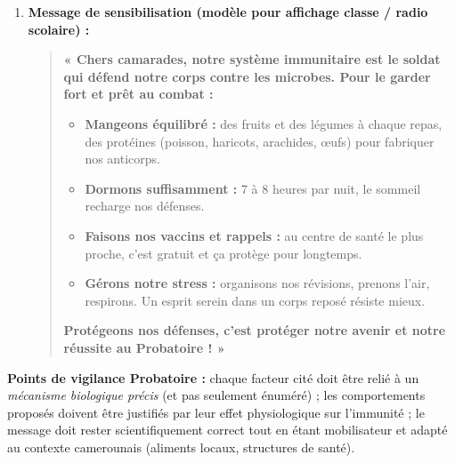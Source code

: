\documentclass[11pt]{article}
\begin{document}
\begin{corrige}
\begin{enumerate}
\begin{itemize}
\item \textbf{Alimentation équilibrée et variée :} consommer des fruits et légumes à chaque repas (vitamines, antioxydants), des sources de protéines de qualité (poisson, viande, œufs, \textbf{haricots}, \textbf{arachides}, soja -- sources locales accessibles) pour fournir les acides aminés nécessaires à la synthèse des immunoglobulines et au renouvellement cellulaire.
\item \textbf{Sommeil réparateur et gestion du stress :} dormir 7 à 8 heures par nuit ; pratiquer des techniques de relaxation (respiration, sport modéré, organisation du travail) pour limiter le cortisol et restaurer l'efficacité des défenses immunitaires.
\item \textbf{Mise à jour vaccinale :} se rendre au centre de santé (CMA, hôpital de district) pour recevoir les rappels dus (dTcoq, Hépatite B, Fièvre jaune, HPV pour les filles...) afin de reconstituer une immunité active durable via la stimulation des cellules mémoires.
\end{itemize}
\item \textbf{Message de sensibilisation (modèle pour affichage classe / radio scolaire) :}
\begin{quote}
\textbf{« Chers camarades, notre système immunitaire est le soldat qui défend notre corps contre les microbes. Pour le garder fort et prêt au combat :}
\begin{itemize}
\item \textbf{Mangeons équilibré :} des fruits et des légumes à chaque repas, des protéines (poisson, haricots, arachides, œufs) pour fabriquer nos anticorps.
\item \textbf{Dormons suffisamment :} 7 à 8 heures par nuit, le sommeil recharge nos défenses.
\item \textbf{Faisons nos vaccins et rappels :} au centre de santé le plus proche, c'est gratuit et ça protège pour longtemps.
\item \textbf{Gérons notre stress :} organisons nos révisions, prenons l'air, respirons. Un esprit serein dans un corps reposé résiste mieux.
\end{itemize}
\textbf{Protégeons nos défenses, c'est protéger notre avenir et notre réussite au Probatoire ! »}
\end{quote}
\end{enumerate}
\textbf{Points de vigilance Probatoire :} chaque facteur cité doit être relié à un \emph{mécanisme biologique précis} (et pas seulement énuméré) ; les comportements proposés doivent être justifiés par leur effet physiologique sur l'immunité ; le message doit rester scientifiquement correct tout en étant mobilisateur et adapté au contexte camerounais (aliments locaux, structures de santé).
\end{corrige}
\end{document}
